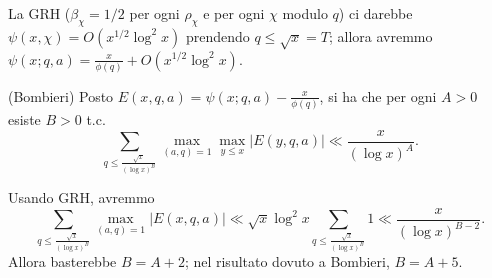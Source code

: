 La GRH ($\beta_\chi=1/2$ per ogni $\rho_\chi$ e per ogni $\chi$ modulo $q$) ci darebbe $\psi(x,\chi)=O(x^{1/2}\log^2{x})$ prendendo $q \le \sqrt{x}=T$; allora avremmo $\psi(x;q,a)=\frac{x}{\phi(q)}+O(x^{1/2}\log^2{x})$.

\begin{prop}
  (Bombieri) Posto $E(x,q,a)=\psi(x;q,a)-\frac{x}{\phi(q)}$, si ha che per ogni $A>0$ esiste $B>0$ t.c.
  $$\sum_{q \le \frac{\sqrt{x}}{(\log{x})^B}} \max_{(a,q)=1}\max_{y \le x} |E(y,q,a)| \ll \frac{x}{(\log{x})^A}.$$
\end{prop}

\begin{oss}
  Usando GRH, avremmo
  $$\sum_{q \le \frac{\sqrt{x}}{(\log{x})^B}} \max_{(a,q)=1} |E(x,q,a)| \ll \sqrt{x}\log^2{x} \sum_{q \le \frac{\sqrt{x}}{(\log{x})^B}} 1 \ll \frac{x}{(\log{x})^{B-2}}.$$
  Allora basterebbe $B=A+2$; nel risultato dovuto a Bombieri, $B=A+5$.
\end{oss}
